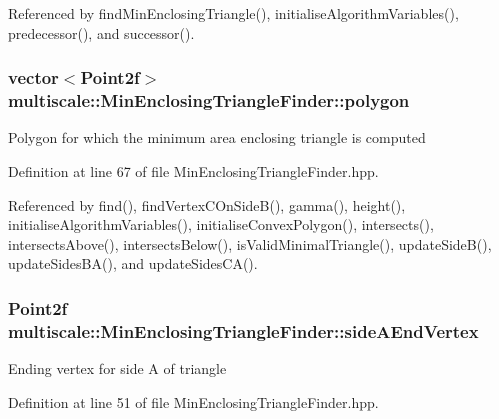 Referenced by find\-Min\-Enclosing\-Triangle(), initialise\-Algorithm\-Variables(), predecessor(), and successor().

\hypertarget{classmultiscale_1_1MinEnclosingTriangleFinder_add5aecf2c138345091d55076bdc253a4}{
\subsubsection[{polygon}]{\setlength{\rightskip}{0pt plus 5cm}vector$<$Point2f$>$ multiscale\-::\-Min\-Enclosing\-Triangle\-Finder\-::polygon\hspace{0.3cm}{\ttfamily [private]}}}\label{classmultiscale_1_1MinEnclosingTriangleFinder_add5aecf2c138345091d55076bdc253a4}
Polygon for which the minimum area enclosing triangle is computed 

Definition at line 67 of file Min\-Enclosing\-Triangle\-Finder.\-hpp.



Referenced by find(), find\-Vertex\-C\-On\-Side\-B(), gamma(), height(), initialise\-Algorithm\-Variables(), initialise\-Convex\-Polygon(), intersects(), intersects\-Above(), intersects\-Below(), is\-Valid\-Minimal\-Triangle(), update\-Side\-B(), update\-Sides\-B\-A(), and update\-Sides\-C\-A().

\hypertarget{classmultiscale_1_1MinEnclosingTriangleFinder_a132a1e2eed61d579e6038089fe08d150}{
\subsubsection[{side\-A\-End\-Vertex}]{\setlength{\rightskip}{0pt plus 5cm}Point2f multiscale\-::\-Min\-Enclosing\-Triangle\-Finder\-::side\-A\-End\-Vertex\hspace{0.3cm}{\ttfamily [private]}}}\label{classmultiscale_1_1MinEnclosingTriangleFinder_a132a1e2eed61d579e6038089fe08d150}
Ending vertex for side A of triangle 

Definition at line 51 of file Min\-Enclosing\-Triangle\-Finder.\-hpp.



